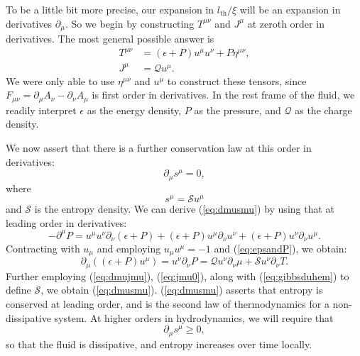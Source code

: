 \documentclass[10pt, oneside]{book}
\begin{document}
\begin{doublespace}
To be a little bit more precise, our expansion in $l_{\mathrm{th}}/\xi$ will be an expansion in derivatives $\partial_\mu$.    So we begin by constructing $T^{\mu\nu}$ and $J^\mu$ at zeroth order in derivatives.   The most general possible answer is \begin{subequations}\begin{align}
T^{\mu\nu} &=  (\epsilon+P)u^\mu u^\nu + P \eta^{\mu\nu}, \\
J^\mu &= \mathcal{Q} u^\mu.  \label{eq:jmu0}
\end{align}\end{subequations}
We were only able to use $\eta^{\mu\nu}$ and $u^\mu$ to construct these tensors, since $F_{\mu\nu} = \partial_\mu A_\nu - \partial_\nu A_\mu$ is first order in derivatives.  In the rest frame of the fluid, we readily interpret $\epsilon$ as the energy density, $P$ as the pressure, and $\mathcal{Q}$ as the charge density.    

We now assert that there is a further conservation law at this order in derivatives: \begin{equation}
\partial_\mu s^\mu = 0,   \label{eq:dmusmu}
\end{equation}
where \begin{equation}
s^\mu = \mathcal{S}u^\mu
\end{equation}
and $\mathcal{S}$ is the entropy density.   We can derive (\ref{eq:dmusmu}) by using that at leading order in derivatives: \begin{equation}
-\partial^\mu P = u^\mu u^\nu \partial_\nu (\epsilon+P) + (\epsilon+P) u^\mu \partial_\nu u^\nu + (\epsilon+P) u^\nu \partial_\nu u^\mu.
\end{equation}
Contracting with $u_\mu$ and employing $u_\mu u^\mu = -1$ and (\ref{eq:epsandP}), we obtain: 
\begin{equation}
\partial_\mu \left((\epsilon+P)u^\mu\right) =  u^\nu\partial_\nu P =  \mathcal{Q} u^\nu \partial_\nu \mu + \mathcal{S}u^\nu \partial_\nu T.
\end{equation}
Further employing (\ref{eq:dmujmu}), (\ref{eq:jmu0}), along with (\ref{eq:gibbsduhem}) to define $\mathcal{S}$, we obtain (\ref{eq:dmusmu}).   (\ref{eq:dmusmu}) asserts that entropy is conserved at leading order, and is the second law of thermodynamics for a non-dissipative system.  At higher orders in hydrodynamics, we will require that \begin{equation}
\partial_\mu s^\mu \ge 0,  \label{eq:hydro2law}
\end{equation}
so that the fluid is dissipative, and entropy increases over time locally.


\end{doublespace}
\end{document}
